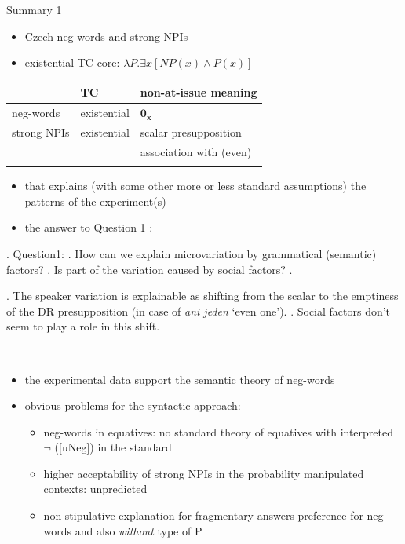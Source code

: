 \documentclass[
  ignorenonframetext,
]{beamer}
\providecommand{\tightlist}{%
  \setlength{\itemsep}{0pt}\setlength{\parskip}{0pt}}\usepackage{longtable,booktabs,array}
\begin{document}
\begin{frame}
\begin{block}{Summary 1}
\protect\hypertarget{summary-1}{}
\begin{itemize}
\tightlist
\item
  Czech neg-words and strong NPIs
\item
  existential TC core: \(\lambda P.\exists x[NP(x) \wedge P(x)]\)
\end{itemize}

\begin{longtable}[]{@{}lll@{}}
\toprule\noalign{}
& TC & non-at-issue meaning \\
\midrule\noalign{}
\endhead
neg-words & existential & \(\mathbf{0_x}\) \\
strong NPIs & existential & scalar presupposition \\
& & association with (even) \\
\bottomrule\noalign{}
\end{longtable}
\end{block}
\end{frame}

\begin{frame}
\begin{itemize}
\tightlist
\item
  that explains (with some other more or less standard assumptions) the
  patterns of the experiment(s)
\item
  the answer to Question 1 :
\end{itemize}

\ex. Question1: \a. How can we explain microvariation by grammatical
(semantic) factors? \b. Is part of the variation caused by social
factors? \z.

\ex. The speaker variation is explainable as shifting from the scalar to
the emptiness of the DR presupposition (in case of \emph{ani jeden}
`even one'). \a. Social factors don't seem to play a role in this shift.

~
\end{frame}

\begin{frame}
\begin{itemize}
\tightlist
\item
  the experimental data support the semantic theory of neg-words
\item
  obvious problems for the syntactic approach:

  \begin{itemize}
  \tightlist
  \item
    neg-words in equatives: no standard theory of equatives with
    interpreted \(\neg\) ({[}uNeg{]}) in the standard
  \item
    higher acceptability of strong NPIs in the probability manipulated
    contexts: unpredicted
  \item
    non-stipulative explanation for fragmentary answers preference for
    neg-words and also \emph{without} type of P
  \end{itemize}
\end{itemize}
\end{frame}
\end{document}
